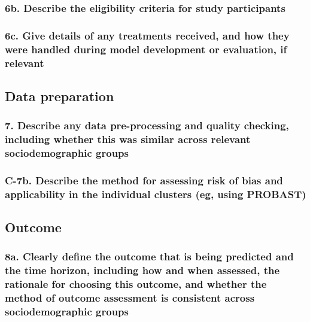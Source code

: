\documentclass[
  letterpaper,
  DIV=11,
  numbers=noendperiod]{scrartcl}
\begin{document}
\subsubsection{6b. Describe the eligibility criteria for study
participants}\label{b.-describe-the-eligibility-criteria-for-study-participants}

\subsubsection{6c. Give details of any treatments received, and how they
were handled during model development or evaluation, if
relevant}\label{c.-give-details-of-any-treatments-received-and-how-they-were-handled-during-model-development-or-evaluation-if-relevant}

\subsection{Data preparation}\label{data-preparation}

\subsubsection{7. Describe any data pre-processing and quality checking,
including whether this was similar across relevant sociodemographic
groups}\label{describe-any-data-pre-processing-and-quality-checking-including-whether-this-was-similar-across-relevant-sociodemographic-groups}

\subsubsection{C-7b. Describe the method for assessing risk of bias and
applicability in the individual clusters (eg, using
PROBAST)}\label{c-7b.-describe-the-method-for-assessing-risk-of-bias-and-applicability-in-the-individual-clusters-eg-using-probast}

\subsection{Outcome}\label{outcome}

\subsubsection{8a. Clearly define the outcome that is being predicted
and the time horizon, including how and when assessed, the rationale for
choosing this outcome, and whether the method of outcome assessment is
consistent across sociodemographic
groups}\label{a.-clearly-define-the-outcome-that-is-being-predicted-and-the-time-horizon-including-how-and-when-assessed-the-rationale-for-choosing-this-outcome-and-whether-the-method-of-outcome-assessment-is-consistent-across-sociodemographic-groups}
\end{document}
